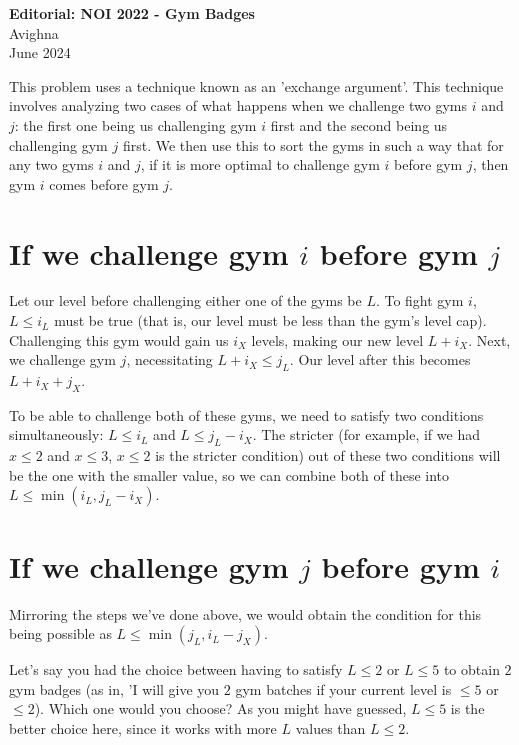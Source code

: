 \documentclass{article}
\begin{document}
\begin{center}
  \large{\textbf{Editorial: NOI 2022 - Gym Badges}}\\
  \vspace{0.2em}
  \large{Avighna}\\
  \vspace{0.2em}
  \large{June 2024}
\end{center}

This problem uses a technique known as an 'exchange argument'. This technique involves analyzing two cases of what happens when we challenge two gyms $i$ and $j$: the first one being us challenging gym $i$ first and the second being us challenging gym $j$ first. We then use this to sort the gyms in such a way that for any two gyms $i$ and $j$, if it is more optimal to challenge gym $i$ before gym $j$, then gym $i$ comes before gym $j$.

\section*{If we challenge gym $i$ before gym $j$}
Let our level before challenging either one of the gyms be $L$. To fight gym $i$, $L \le i_L$ must be true (that is, our level must be less than the gym's level cap). Challenging this gym would gain us $i_X$ levels, making our new level $L+i_X$. Next, we challenge gym $j$, necessitating $L + i_X \le j_L$. Our level after this becomes $L+i_X+j_X$.

To be able to challenge both of these gyms, we need to satisfy two conditions simultaneously: $L \le i_L$ and $L \le j_L-i_X$. The stricter (for example, if we had $x \le 2$ and $x \le 3$, $x \le 2$ is the stricter condition) out of these two conditions will be the one with the smaller value, so we can combine both of these into $L \le \min(i_L,j_L-i_X)$.

\section*{If we challenge gym $j$ before gym $i$}
Mirroring the steps we've done above, we would obtain the condition for this being possible as $L \le \min(j_L,i_L-j_X)$.

Let's say you had the choice between having to satisfy $L \le 2$ or $L \le 5$ to obtain $2$ gym badges (as in, 'I will give you $2$ gym batches if your current level is $\le 5$ or $\le 2$). Which one would you choose? As you might have guessed, $L \le 5$ is the better choice here, since it works with more $L$ values than $L\le2$.
\end{document}
